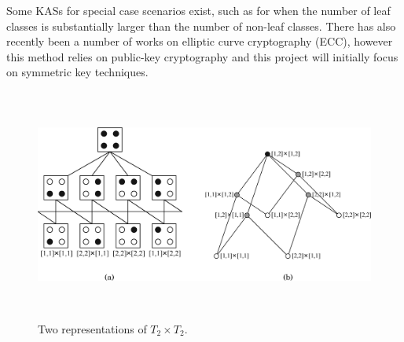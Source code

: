 \documentclass[10pt, titlepage]{article}
\begin{document}
Some KASs for special case scenarios exist, such as for when the number of leaf classes is substantially larger than the number of non-leaf classes.\cite{largeLeaf} There has also recently been a number of works on elliptic curve cryptography (ECC)\cite{ecc1}\cite{ecc2}, however this method relies on public-key cryptography and this project will initially focus on symmetric key techniques.

\begin{figure}
\centerline{\includegraphics[height=3.0in,width=6in,angle=0]{geospatial.pdf}}
\caption{Two representations of $T_{2} \times T_{2}$.\cite{mainPaper}}
\label{fig:geospatial}
\end{figure}
\end{document}
